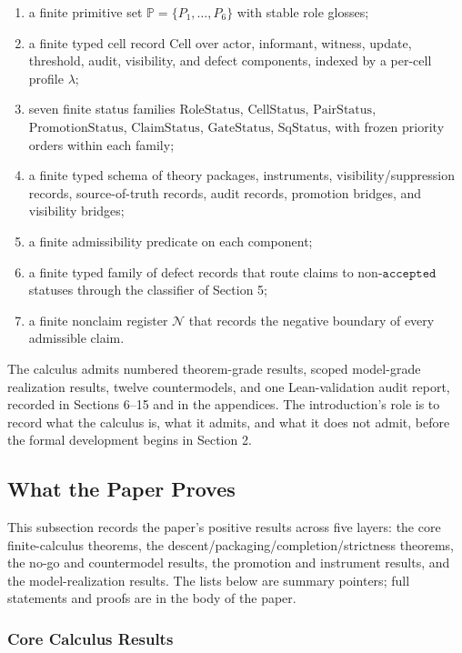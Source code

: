 \documentclass[11pt]{article}
\providecommand{\tightlist}{}
\theoremstyle{definition}
\begin{document}
\begin{enumerate}
\def\labelenumi{\arabic{enumi}.}
\tightlist
\item
  a finite primitive set \(\mathbb P=\{P_{1},\ldots,P_{6}\}\) with stable role glosses;
\item
  a finite typed cell record \(\mathrm{Cell}\) over actor, informant, witness, update, threshold, audit, visibility, and defect components, indexed by a per-cell profile \(\lambda\);
\item
  seven finite status families \(\mathrm{RoleStatus}\), \(\mathrm{CellStatus}\), \(\mathrm{PairStatus}\), \(\mathrm{PromotionStatus}\), \(\mathrm{ClaimStatus}\), \(\mathrm{GateStatus}\), \(\mathrm{SqStatus}\), with frozen priority orders within each family;
\item
  a finite typed schema of theory packages, instruments, visibility/suppression records, source-of-truth records, audit records, promotion bridges, and visibility bridges;
\item
  a finite admissibility predicate on each component;
\item
  a finite typed family of defect records that route claims to non-\(\texttt{accepted}\) statuses through the classifier of Section 5;
\item
  a finite nonclaim register \(\mathcal N\) that records the negative boundary of every admissible claim.
\end{enumerate}

The calculus admits numbered theorem-grade results, scoped model-grade realization results, twelve countermodels, and one Lean-validation audit report, recorded in Sections 6--15 and in the appendices. The introduction's role is to record what the calculus is, what it admits, and what it does not admit, before the formal development begins in Section 2.

\subsection{What the Paper Proves}

This subsection records the paper's positive results across five layers: the core finite-calculus theorems, the descent/packaging/completion/strictness theorems, the no-go and countermodel results, the promotion and instrument results, and the model-realization results. The lists below are summary pointers; full statements and proofs are in the body of the paper.

\subsubsection{Core Calculus Results}
\end{document}
